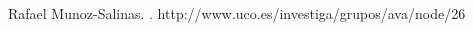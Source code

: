 \documentclass[pdflatex,11pt]{aghdpl}
\author{Ksawery Głaz}
\date{2016}
\begin{document}
\titlepages

\tableofcontents
\clearpage









% 
% 



\begin{thebibliography}{1}

Rafael Munoz-Salinas.
.
\newblock http://www.uco.es/investiga/grupos/ava/node/26



\end{thebibliography}
\end{document}
